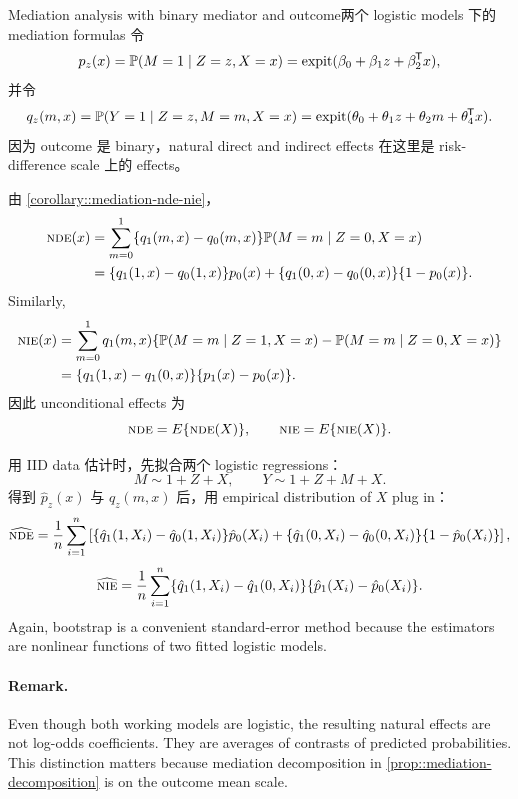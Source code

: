 \begin{exercisesolution}{Mediation analysis with binary mediator and outcome}{两个 logistic models 下的 mediation formulas}
令
\[
p_z(x)=\mathbb{P}(M=1\mid Z=z,X=x)
=
\textup{expit}(\beta_0+\beta_1z+\beta_2^{\mkern-1.5mu\mathsf{T}} x),
\]
并令
\[
q_z(m,x)=\mathbb{P}(Y=1\mid Z=z,M=m,X=x)
=
\textup{expit}(\theta_0+\theta_1z+\theta_2m+\theta_4^{\mkern-1.5mu\mathsf{T}} x).
\]
因为 outcome 是 binary，natural direct and indirect effects 在这里是 risk-difference scale 上的 effects。

由 \cref{corollary::mediation-nde-nie}，
\begin{align*}
\textsc{nde}(x)
&=
\sum_{m=0}^1 \{q_1(m,x)-q_0(m,x)\}
\mathbb{P}(M=m\mid Z=0,X=x)\\
&=
\{q_1(1,x)-q_0(1,x)\}p_0(x)
+\{q_1(0,x)-q_0(0,x)\}\{1-p_0(x)\}.
\end{align*}
Similarly,
\begin{align*}
\textsc{nie}(x)
&=
\sum_{m=0}^1 q_1(m,x)
\{\mathbb{P}(M=m\mid Z=1,X=x)-\mathbb{P}(M=m\mid Z=0,X=x)\}\\
&=
\{q_1(1,x)-q_1(0,x)\}\{p_1(x)-p_0(x)\}.
\end{align*}
因此 unconditional effects 为
\[
\textsc{nde}=E\{\textsc{nde}(X)\},\qquad \textsc{nie}=E\{\textsc{nie}(X)\}.
\]

用 IID data 估计时，先拟合两个 logistic regressions：
\[
M\sim 1+Z+X,\qquad Y\sim 1+Z+M+X.
\]
得到 $\hat p_z(x)$ 与 $\hat q_z(m,x)$ 后，用 empirical distribution of $X$ plug in：
\[
\widehat{\textsc{nde}}
=
\frac{1}{n}\sum_{i=1}^n
\left[
\{\hat q_1(1,X_i)-\hat q_0(1,X_i)\}\hat p_0(X_i)
+\{\hat q_1(0,X_i)-\hat q_0(0,X_i)\}\{1-\hat p_0(X_i)\}
\right],
\]
\[
\widehat{\textsc{nie}}
=
\frac{1}{n}\sum_{i=1}^n
\{\hat q_1(1,X_i)-\hat q_1(0,X_i)\}
\{\hat p_1(X_i)-\hat p_0(X_i)\}.
\]
Again, bootstrap is a convenient standard-error method because the estimators are nonlinear functions of two fitted logistic models.

\paragraph{Remark.}
Even though both working models are logistic, the resulting natural effects are not log-odds coefficients. They are averages of contrasts of predicted probabilities. This distinction matters because mediation decomposition in \cref{prop::mediation-decomposition} is on the outcome mean scale.
\end{exercisesolution}

